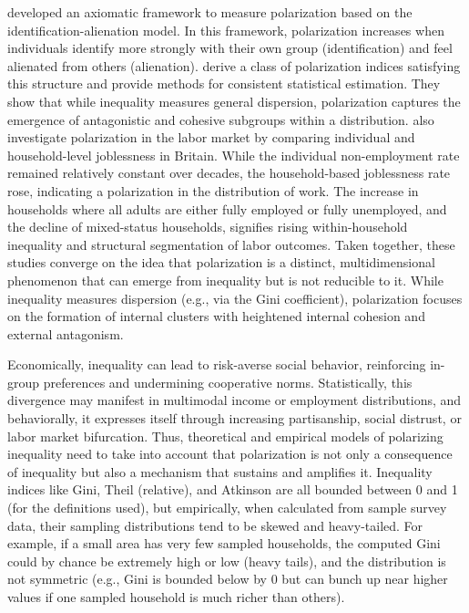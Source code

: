 \documentclass[11pt]{article}
\begin{document}
\citet{duclos2004polarization} developed an axiomatic framework to measure polarization based on the identification-alienation model. In this framework, polarization increases when individuals identify more strongly with their own group (identification) and feel alienated from others (alienation). \citet{duclos2004polarization} derive a class of polarization indices satisfying this structure and provide methods for consistent statistical estimation. They show that while inequality measures general dispersion, polarization captures the emergence of antagonistic and cohesive subgroups within a distribution. \citet{gregg2008two} also investigate polarization in the labor market by comparing individual and household-level joblessness in Britain. While the individual non-employment rate remained relatively constant over decades, the household-based joblessness rate rose, indicating a polarization in the distribution of work. The increase in households where all adults are either fully employed or fully unemployed, and the decline of mixed-status households, signifies rising within-household inequality and structural segmentation of labor outcomes. Taken together, these studies converge on the idea that polarization is a distinct, multidimensional phenomenon that can emerge from inequality but is not reducible to it. While inequality measures dispersion (e.g., via the Gini coefficient), polarization focuses on the formation of internal clusters with heightened internal cohesion and external antagonism. 

Economically, inequality can lead to risk-averse social behavior, reinforcing in-group preferences and undermining cooperative norms. Statistically, this divergence may manifest in multimodal income or employment distributions, and behaviorally, it expresses itself through increasing partisanship, social distrust, or labor market bifurcation. Thus, theoretical and empirical models of polarizing inequality need to take into account that polarization is not only a consequence of inequality but also a mechanism that sustains and amplifies it. Inequality indices like Gini, Theil (relative), and Atkinson are all bounded between 0 and 1 (for the definitions used), but empirically, when calculated from sample survey data, their sampling distributions tend to be skewed and heavy-tailed. For example, if a small area has very few sampled households, the computed Gini could by chance be extremely high or low (heavy tails), and the distribution is not symmetric (e.g., Gini is bounded below by 0 but can bunch up near higher values if one sampled household is much richer than others). 
\end{document}
